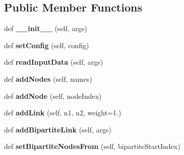 \subsection*{Public Member Functions}
\begin{DoxyCompactItemize}
\item 
\mbox{\label{classdsmacc_1_1graph_1_1infomap_1_1Network_af79ef36f9039aa6a38d0973456b297de}} 
def {\bfseries \+\_\+\+\_\+init\+\_\+\+\_\+} (self, args)
\item 
\mbox{\label{classdsmacc_1_1graph_1_1infomap_1_1Network_a73ab5b5f00df067e49060711d43fa509}} 
def {\bfseries set\+Config} (self, config)
\item 
\mbox{\label{classdsmacc_1_1graph_1_1infomap_1_1Network_a7bc13b523c7b836f81315d15ff39d93f}} 
def {\bfseries read\+Input\+Data} (self, args)
\item 
\mbox{\label{classdsmacc_1_1graph_1_1infomap_1_1Network_a849083a821382b2765d792f481485b81}} 
def {\bfseries add\+Nodes} (self, names)
\item 
\mbox{\label{classdsmacc_1_1graph_1_1infomap_1_1Network_ac067d4622309d6a5be436fbb94b4947d}} 
def {\bfseries add\+Node} (self, node\+Index)
\item 
\mbox{\label{classdsmacc_1_1graph_1_1infomap_1_1Network_af2ce3d8f7ef44b7fbfd5ab5dd97354fe}} 
def {\bfseries add\+Link} (self, n1, n2, weight=1.)
\item 
\mbox{\label{classdsmacc_1_1graph_1_1infomap_1_1Network_a826ed520ca80d3cd33c6eec83f965a30}} 
def {\bfseries add\+Bipartite\+Link} (self, args)
\item 
\mbox{\label{classdsmacc_1_1graph_1_1infomap_1_1Network_aec0318d43879701fa069beed28ab88d6}} 
def {\bfseries set\+Bipartite\+Nodes\+From} (self, bipartite\+Start\+Index)
\item 
\mbox{\label{classdsmacc_1_1graph_1_1infomap_1_1Network_aaa0375ec9eef37856538b53741c5eb27}} 

\end{DoxyCompactItemize}
